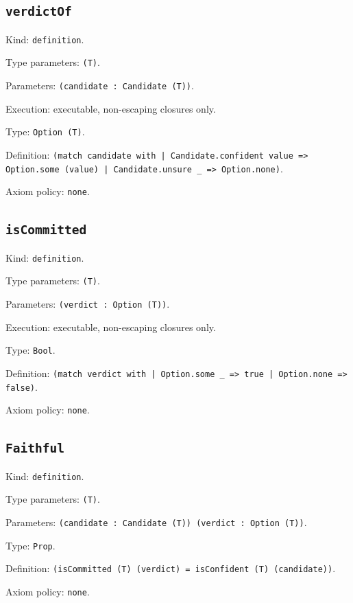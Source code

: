 \documentclass[11pt]{article}
\begin{document}
\subsection*{\texttt{verdictOf}}
\noindent Kind: \texttt{definition}.\par
\noindent Type parameters: \texttt{(T)}.\par
\noindent Parameters: \texttt{(candidate : Candidate (T))}.\par
\noindent Execution: executable, non-escaping closures only.\par
\noindent Type: \texttt{Option (T)}.\par
\noindent Definition: \texttt{(match candidate with | Candidate.confident value => Option.some (value) | Candidate.unsure \_ => Option.none)}.\par
\noindent Axiom policy: \texttt{none}.\par
\subsection*{\texttt{isCommitted}}
\noindent Kind: \texttt{definition}.\par
\noindent Type parameters: \texttt{(T)}.\par
\noindent Parameters: \texttt{(verdict : Option (T))}.\par
\noindent Execution: executable, non-escaping closures only.\par
\noindent Type: \texttt{Bool}.\par
\noindent Definition: \texttt{(match verdict with | Option.some \_ => true | Option.none => false)}.\par
\noindent Axiom policy: \texttt{none}.\par
\subsection*{\texttt{Faithful}}
\noindent Kind: \texttt{definition}.\par
\noindent Type parameters: \texttt{(T)}.\par
\noindent Parameters: \texttt{(candidate : Candidate (T)) (verdict : Option (T))}.\par
\noindent Type: \texttt{Prop}.\par
\noindent Definition: \texttt{(isCommitted (T) (verdict) = isConfident (T) (candidate))}.\par
\noindent Axiom policy: \texttt{none}.\par
\end{document}
